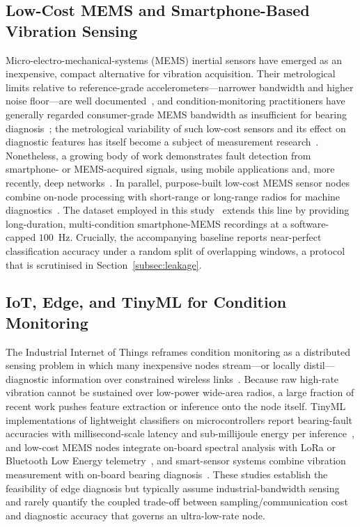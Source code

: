 \subsection{Low-Cost MEMS and Smartphone-Based Vibration Sensing}
Micro-electro-mechanical-systems (MEMS) inertial sensors have emerged as an
inexpensive, compact alternative for vibration acquisition. Their metrological
limits relative to reference-grade accelerometers---narrower bandwidth and
higher noise floor---are well documented~\cite{grouios2022accelerometers}, and
condition-monitoring practitioners have generally regarded consumer-grade MEMS
bandwidth as insufficient for bearing diagnosis~\cite{pedotti2020lowcost}; the
metrological variability of such low-cost sensors and its effect on diagnostic
features has itself become a subject of measurement research~\cite{demilia2021mems}.
Nonetheless, a growing body of work demonstrates fault detection from
smartphone- or MEMS-acquired signals, using mobile applications and, more
recently, deep networks~\cite{naha2017mobile, ertargin2023deep,
ertargin2025automated}. In parallel, purpose-built low-cost MEMS sensor nodes
combine on-node processing with short-range or long-range radios for machine
diagnostics~\cite{pedotti2020lowcost, jakobsen2024lowcost}. The dataset employed
in this study~\cite{ertargin2026smartphone, ertargin2026dataset} extends this
line by providing long-duration, multi-condition smartphone-MEMS recordings at a
software-capped $100$~Hz. Crucially, the accompanying baseline reports
near-perfect classification accuracy under a random split of overlapping
windows, a protocol that is scrutinised in Section~\ref{subsec:leakage}.

\subsection{IoT, Edge, and TinyML for Condition Monitoring}
The Industrial Internet of Things reframes condition monitoring as a distributed
sensing problem in which many inexpensive nodes stream---or locally
distil---diagnostic information over constrained wireless
links~\cite{yousuf2024iot}. Because raw high-rate vibration cannot be sustained
over low-power wide-area radios, a large fraction of recent work pushes feature
extraction or inference onto the node itself. TinyML implementations of
lightweight classifiers on microcontrollers report bearing-fault accuracies with
millisecond-scale latency and sub-millijoule energy per
inference~\cite{gao2025edge, asutkar2023tinyml}, and low-cost MEMS nodes
integrate on-board spectral analysis with LoRa or Bluetooth Low Energy
telemetry~\cite{jakobsen2024lowcost}, and smart-sensor systems combine vibration
measurement with on-board bearing diagnosis~\cite{shukla2020smartsensor}. These
studies establish the feasibility of
edge diagnosis but typically assume industrial-bandwidth sensing and rarely
quantify the coupled trade-off between sampling/communication cost and diagnostic
accuracy that governs an ultra-low-rate node.

